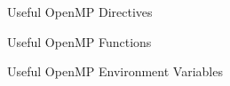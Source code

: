 \documentclass[10pt]{beamer}
\begin{document}
\begin{frame}{Useful OpenMP Directives}



\end{frame}

\begin{frame}{Useful OpenMP Functions}



\end{frame}

\begin{frame}{Useful OpenMP Environment Variables}



\end{frame}
\end{document}
